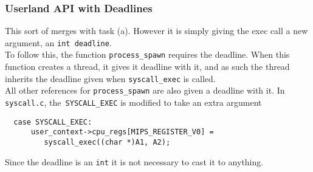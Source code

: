 \documentclass[12pt]{article}
\begin{document}
\subsubsection{Userland API with Deadlines}
This sort of merges with task (a). However it is simply giving the exec call a new argument, an \texttt{int deadline}.\\
To follow this, the function \texttt{process\_spawn} requires the deadline. When this function creates a thread, it gives it deadline with it, and as such the thread inherits the deadline given when \texttt{syscall\_exec} is called.\\
All other references for \texttt{process\_spawn} are also given a deadline with it.
In \texttt{syscall.c}, the\texttt{ SYSCALL\_EXEC} is modified to take an extra argument
\begin{verbatim}
  case SYSCALL_EXEC:
      user_context->cpu_regs[MIPS_REGISTER_V0] =
         syscall_exec((char *)A1, A2);
\end{verbatim}
Since the deadline is an \texttt{int} it is not necessary to cast it to anything.
\end{document}
